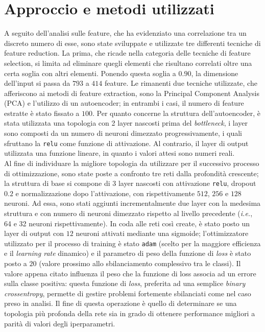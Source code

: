 \section{Approccio e metodi utilizzati}
A seguito dell'analisi sulle feature, che ha evidenziato una correlazione tra un discreto numero di esse, sono state sviluppate e utilizzate tre differenti tecniche di feature reduction. 
La prima, che ricade nella categoria delle tecniche di feature selection, si limita ad eliminare quegli elementi che risultano correlati oltre una certa soglia con altri elementi. 
Ponendo questa soglia a $0.90$, la dimensione dell'input si passa da $793$ a $414$ feature.
Le rimanenti due tecniche utilizzate, che afferiscono ai metodi di feature extraction, sono la Principal Component Analysis (PCA) e l'utilizzo di un autoencoder; in entrambi i casi, il numero di feature estratte è stato fissato a $100$.
Per quanto concerne la struttura dell'autoencoder, è stata utilizzata una topologia con 2 layer nascosti prima del \textit{bottleneck}, i layer sono composti da un numero di neuroni dimezzato progressivamente, i quali sfruttano la \texttt{relu} come funzione di attivazione. 
Al contrario, il layer di output utilizzata una funzione lineare, in quanto i valori attesi sono numeri reali.\\
Al fine di individuare la migliore topologia da utilizzare per il successivo processo di ottimizzazione, sono state poste a confronto tre reti dalla profondità crescente; la struttura di base si compone di $3$ layer nascosti con attivazione \texttt{relu}, dropout $0.2$ e normalizzazione dopo l'attivazione, con rispettivamente $512$, $256$ e $128$ neuroni. 
Ad essa, sono stati aggiunti incrementalmente due layer con la medesima struttura e con numero di neuroni dimezzato rispetto al livello precedente (\textit{i.e.}, 64 e 32 neuroni rispettivamente). 
In coda alle reti così create, è stato posto un layer di output con $12$ neuroni attivati mediante una sigmoide; l'ottimizzatore utilizzato per il processo di training è stato \texttt{adam} (scelto per la maggiore efficienza e il \textit{learning rate} dinamico) e il parametro di peso della funzione di \textit{loss} è stato posto a $20$ (valore prossimo allo sbilanciamento complessivo tra le classi). Il valore appena citato influenza il peso che la funzione di loss associa ad un errore sulla classe positiva: questa funzione di \textit{loss}, preferita ad una semplice \textit{binary crossentropy}, permette di gestire problemi fortemente sbilanciati come nel caso preso in analisi.
Il fine di questa operazione è quello di determinare se una topologia più profonda della rete  sia in grado di ottenere performance migliori a parità di valori degli iperparametri.

